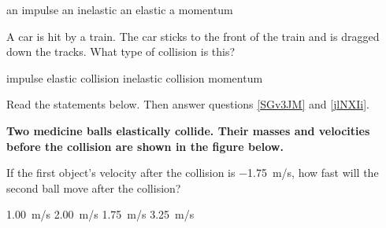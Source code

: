 \documentclass{exam}
\begin{document}
\begin{questions}
\begin{randomizechoices}
\choice an impulse
\choice an inelastic
\correctchoice an elastic
\choice a momentum
\end{randomizechoices}

\question
A car is hit by a train. The car sticks to the front of the train and is dragged down the tracks. What type of collision is this?

\begin{randomizechoices}
\choice impulse
\choice elastic collision
\correctchoice inelastic collision
\choice momentum
\end{randomizechoices}

\clearpage


\begin{EnvUplevel}
Read the statements below. Then answer questions \ref{SGv3JM} and \ref{jlNXIi}.

\textbf{Two medicine balls elastically collide. Their masses and velocities before the collision are shown in the figure below.}
\end{EnvUplevel}

\begin{center}
\def\xa{1.5}
\def\xb{8.5}
\def\y{3}
\def\rb{6mm}
\end{center}

\question \label{SGv3JM}
If the first object's velocity after the collision is \SI{-1.75}{m/s}, how fast will the second ball move after the collision?

\begin{randomizechoices}
\choice \SI{1.00}{m/s}
\correctchoice \SI{2.00}{m/s} 
\choice \SI{1.75}{m/s}
\choice \SI{3.25}{m/s}
\end{randomizechoices}


\end{questions}
\end{document}
